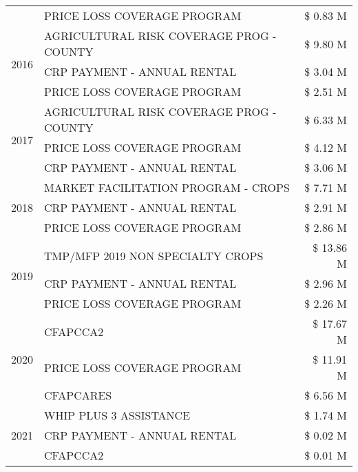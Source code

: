 \begin{tabular}{llr}
 & PRICE LOSS COVERAGE PROGRAM & \$ 0.83 M \\
\cline{1-3}
\multirow[t]{3}{*}{2016} & AGRICULTURAL RISK COVERAGE PROG - COUNTY & \$ 9.80 M \\
 & CRP PAYMENT - ANNUAL RENTAL & \$ 3.04 M \\
 & PRICE LOSS COVERAGE PROGRAM & \$ 2.51 M \\
\cline{1-3}
\multirow[t]{3}{*}{2017} & AGRICULTURAL RISK COVERAGE PROG - COUNTY & \$ 6.33 M \\
 & PRICE LOSS COVERAGE PROGRAM & \$ 4.12 M \\
 & CRP PAYMENT - ANNUAL RENTAL & \$ 3.06 M \\
\cline{1-3}
\multirow[t]{3}{*}{2018} & MARKET FACILITATION PROGRAM - CROPS & \$ 7.71 M \\
 & CRP PAYMENT - ANNUAL RENTAL & \$ 2.91 M \\
 & PRICE LOSS COVERAGE PROGRAM & \$ 2.86 M \\
\cline{1-3}
\multirow[t]{3}{*}{2019} & TMP/MFP 2019 NON SPECIALTY CROPS & \$ 13.86 M \\
 & CRP PAYMENT - ANNUAL RENTAL & \$ 2.96 M \\
 & PRICE LOSS COVERAGE PROGRAM & \$ 2.26 M \\
\cline{1-3}
\multirow[t]{3}{*}{2020} & CFAPCCA2 & \$ 17.67 M \\
 & PRICE LOSS COVERAGE PROGRAM & \$ 11.91 M \\
 & CFAPCARES & \$ 6.56 M \\
\cline{1-3}
\multirow[t]{3}{*}{2021} & WHIP PLUS 3 ASSISTANCE & \$ 1.74 M \\
 & CRP PAYMENT - ANNUAL RENTAL & \$ 0.02 M \\
 & CFAPCCA2 & \$ 0.01 M \\
\cline{1-3}
\bottomrule
\end{tabular}
